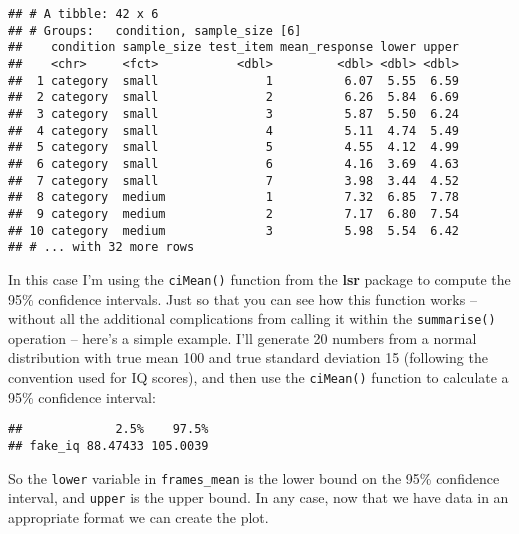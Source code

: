 \documentclass[]{book}
\newenvironment{Shaded}{\begin{snugshade}}{\end{snugshade}}
\newcommand{\CommentTok}[1]{\textcolor[rgb]{0.56,0.35,0.01}{\textit{#1}}}
\newcommand{\DataTypeTok}[1]{\textcolor[rgb]{0.13,0.29,0.53}{#1}}
\newcommand{\DecValTok}[1]{\textcolor[rgb]{0.00,0.00,0.81}{#1}}
\newcommand{\KeywordTok}[1]{\textcolor[rgb]{0.13,0.29,0.53}{\textbf{#1}}}
\newcommand{\NormalTok}[1]{#1}
\newcommand{\OperatorTok}[1]{\textcolor[rgb]{0.81,0.36,0.00}{\textbf{#1}}}
\newcommand{\StringTok}[1]{\textcolor[rgb]{0.31,0.60,0.02}{#1}}
\begin{document}
\begin{verbatim}
## # A tibble: 42 x 6
## # Groups:   condition, sample_size [6]
##    condition sample_size test_item mean_response lower upper
##    <chr>     <fct>           <dbl>         <dbl> <dbl> <dbl>
##  1 category  small               1          6.07  5.55  6.59
##  2 category  small               2          6.26  5.84  6.69
##  3 category  small               3          5.87  5.50  6.24
##  4 category  small               4          5.11  4.74  5.49
##  5 category  small               5          4.55  4.12  4.99
##  6 category  small               6          4.16  3.69  4.63
##  7 category  small               7          3.98  3.44  4.52
##  8 category  medium              1          7.32  6.85  7.78
##  9 category  medium              2          7.17  6.80  7.54
## 10 category  medium              3          5.98  5.54  6.42
## # ... with 32 more rows
\end{verbatim}

In this case I'm using the \texttt{ciMean()} function from the \textbf{lsr} package to compute the 95\% confidence intervals. Just so that you can see how this function works -- without all the additional complications from calling it within the \texttt{summarise()} operation -- here's a simple example. I'll generate 20 numbers from a normal distribution with true mean 100 and true standard deviation 15 (following the convention used for IQ scores), and then use the \texttt{ciMean()} function to calculate a 95\% confidence interval:

\begin{Shaded}
\end{Shaded}

\begin{verbatim}
##             2.5%    97.5%
## fake_iq 88.47433 105.0039
\end{verbatim}

So the \texttt{lower} variable in \texttt{frames\_mean} is the lower bound on the 95\% confidence interval, and \texttt{upper} is the upper bound. In any case, now that we have data in an appropriate format we can create the plot.
\end{document}
